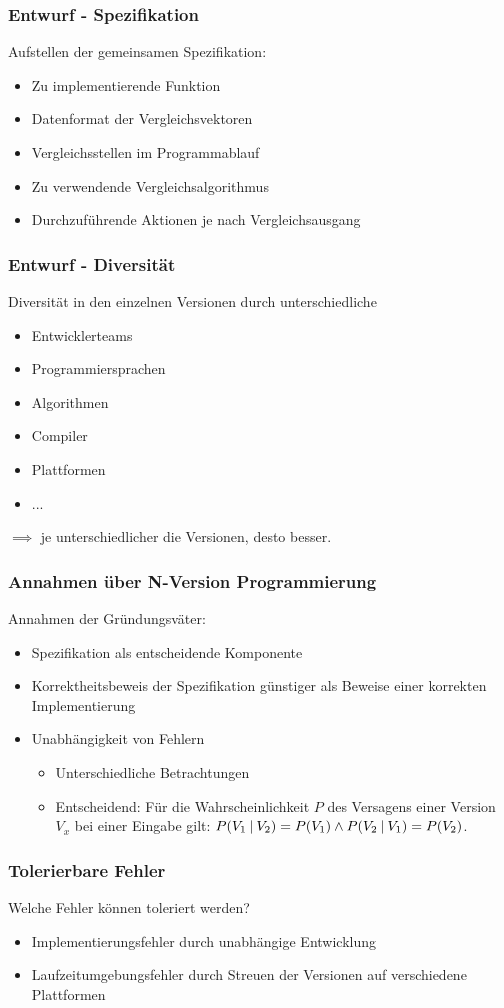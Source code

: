 %
%
\begin{frame}
	\frametitle{Entwurf - Spezifikation}
	Aufstellen der gemeinsamen Spezifikation:
	\begin{itemize}
		\item Zu implementierende Funktion
		\item Datenformat der Vergleichsvektoren
		\item Vergleichsstellen im Programmablauf
		\item Zu verwendende Vergleichsalgorithmus
		\item Durchzuführende Aktionen je nach Vergleichsausgang
	\end{itemize}
\end{frame}
%
%
\begin{frame}
	\frametitle{Entwurf - Diversität}
	Diversität in den einzelnen Versionen durch unterschiedliche
	\begin{itemize}
		\item Entwicklerteams
		\item Programmiersprachen
		\item Algorithmen
		\item Compiler
		\item Plattformen
		\item ...
	\end{itemize}
	$\implies$ je unterschiedlicher die Versionen, desto besser.
\end{frame}
%
%
\begin{frame}
	\frametitle{Annahmen über N-Version Programmierung}
	Annahmen der Gründungsväter:
	\begin{itemize}		
		\item Spezifikation als entscheidende Komponente		
		\item Korrektheitsbeweis der Spezifikation günstiger als Beweise einer korrekten Implementierung
		\pause
		\item Unabhängigkeit von Fehlern
		\begin{itemize}		
			\item Unterschiedliche Betrachtungen
			\item Entscheidend:	Für die Wahrscheinlichkeit $P$ des Versagens einer Version $V_{x}$ bei einer Eingabe gilt: $P(V_{1}\:\vert\: V_{2}) = P(V_{1}) \land P(V_{2}\:\vert\: V_{1}) = P(V_{2})$.
		\end{itemize}
	\end{itemize}
\end{frame}
%
%
\begin{frame}
	\frametitle{Tolerierbare Fehler}
	Welche Fehler können toleriert werden?
	\begin{itemize}		
		\item Implementierungsfehler durch unabhängige Entwicklung
		\item Laufzeitumgebungsfehler durch Streuen der Versionen auf verschiedene Plattformen
	\end{itemize}
\end{frame}
%
%
